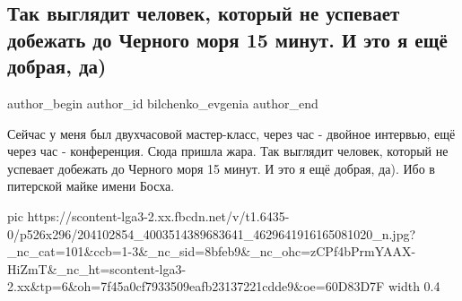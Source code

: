  
 
 
 
 
 
\subsection{Так выглядит человек, который не успевает добежать до Черного моря 15 минут. И это я ещё добрая, да)}
\label{sec:23_06_2021.fb.bilchenko_evgenia.6.rasporjadok_dnja}
\ifcmt
 author_begin
   author_id bilchenko_evgenia
 author_end
\fi

Сейчас у меня был двухчасовой мастер-класс, через час - двойное интервью, ещё
через час - конференция. Сюда пришла жара. Так выглядит человек, который не
успевает добежать до Черного моря 15 минут. И это я ещё добрая, да). Ибо в
питерской майке имени Босха.

\ifcmt
  pic https://scontent-lga3-2.xx.fbcdn.net/v/t1.6435-0/p526x296/204102854_4003514389683641_4629641916165081020_n.jpg?_nc_cat=101&ccb=1-3&_nc_sid=8bfeb9&_nc_ohc=zCPf4bPrmYAAX-HiZmT&_nc_ht=scontent-lga3-2.xx&tp=6&oh=7f45a0cf7933509eafb23137221cdde9&oe=60D83D7F
	width 0.4
\fi
